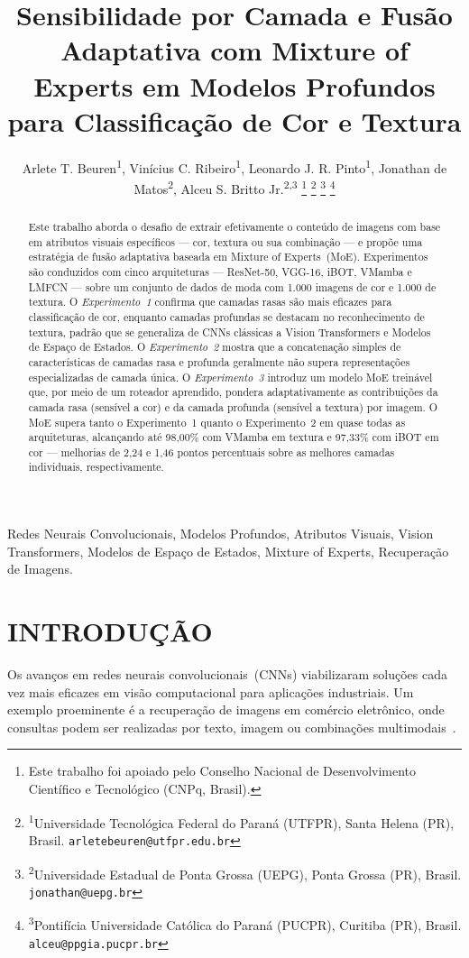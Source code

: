 \documentclass[letterpaper, 10 pt, conference]{ieeeconf}
\title{\LARGE \bf
Sensibilidade por Camada e Fusão Adaptativa com Mixture of Experts
em Modelos Profundos para Classificação de Cor e Textura
}
\author{
    Arlete T. Beuren\textsuperscript{1},
    Vinícius C. Ribeiro\textsuperscript{1},
    Leonardo J. R. Pinto\textsuperscript{1},
    Jonathan de Matos\textsuperscript{2},
    Alceu S. Britto Jr.\textsuperscript{2,3}%
    \thanks{Este trabalho foi apoiado pelo Conselho Nacional de
            Desenvolvimento Científico e Tecnológico (CNPq, Brasil).}%
    \thanks{\textsuperscript{1}Universidade Tecnológica Federal do Paraná
            (UTFPR), Santa Helena (PR), Brasil.
            \texttt{arletebeuren@utfpr.edu.br}}%
    \thanks{\textsuperscript{2}Universidade Estadual de Ponta Grossa (UEPG),
            Ponta Grossa (PR), Brasil.
            \texttt{jonathan@uepg.br}}%
    \thanks{\textsuperscript{3}Pontifícia Universidade Católica do Paraná
            (PUCPR), Curitiba (PR), Brasil.
            \texttt{alceu@ppgia.pucpr.br}}%
}
\begin{document}
\maketitle
\thispagestyle{empty}
\pagestyle{empty}

\begin{abstract}

Este trabalho aborda o desafio de extrair efetivamente o conteúdo de
imagens com base em atributos visuais específicos — cor, textura ou sua
combinação — e propõe uma estratégia de fusão adaptativa baseada em
Mixture of Experts~(MoE).
Experimentos são conduzidos com cinco arquiteturas — ResNet-50, VGG-16,
iBOT, VMamba e LMFCN — sobre um conjunto de dados de moda com 1.000
imagens de cor e 1.000 de textura.
O \emph{Experimento~1} confirma que camadas rasas são mais eficazes para
classificação de cor, enquanto camadas profundas se destacam no
reconhecimento de textura, padrão que se generaliza de CNNs clássicas
a Vision Transformers e Modelos de Espaço de Estados.
O \emph{Experimento~2} mostra que a concatenação simples de características
de camadas rasa e profunda geralmente não supera representações
especializadas de camada única.
O \emph{Experimento~3} introduz um modelo MoE treinável que, por meio de
um roteador aprendido, pondera adaptativamente as contribuições da camada
rasa (sensível a cor) e da camada profunda (sensível a textura) por imagem.
O MoE supera tanto o Experimento~1 quanto o Experimento~2 em quase todas as
arquiteturas, alcançando até 98,00\% com VMamba em textura e 97,33\% com
iBOT em cor — melhorias de 2,24 e 1,46 pontos percentuais sobre as melhores
camadas individuais, respectivamente.

\end{abstract}

\begin{IEEEkeywords}
Redes Neurais Convolucionais, Modelos Profundos, Atributos Visuais,
Vision Transformers, Modelos de Espaço de Estados, Mixture of Experts,
Recuperação de Imagens.
\end{IEEEkeywords}

\section{INTRODUÇÃO}

Os avanços em redes neurais convolucionais~(CNNs) viabilizaram soluções cada
vez mais eficazes em visão computacional para aplicações industriais.
Um exemplo proeminente é a recuperação de imagens em comércio eletrônico,
onde consultas podem ser realizadas por texto, imagem ou combinações
multimodais~\cite{b1}.
\end{document}
